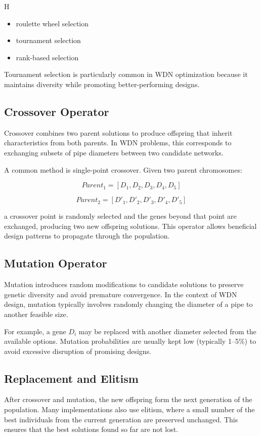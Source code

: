 H\documentclass[12pt, a4paper]{article}
\begin{document}
\begin{itemize}
\item roulette wheel selection
\item tournament selection
\item rank-based selection
\end{itemize}

Tournament selection is particularly common in WDN optimization because it maintains diversity while promoting better-performing designs.

\subsection*{Crossover Operator}

Crossover combines two parent solutions to produce offspring that inherit characteristics from both parents. In WDN problems, this corresponds to exchanging subsets of pipe diameters between two candidate networks.

A common method is single-point crossover. Given two parent chromosomes:

\[
Parent_1 = [D_1, D_2, D_3, D_4, D_5]
\]

\[
Parent_2 = [D'_1, D'_2, D'_3, D'_4, D'_5]
\]

a crossover point is randomly selected and the genes beyond that point are exchanged, producing two new offspring solutions. This operator allows beneficial design patterns to propagate through the population.

\subsection*{Mutation Operator}

Mutation introduces random modifications to candidate solutions to preserve genetic diversity and avoid premature convergence. In the context of WDN design, mutation typically involves randomly changing the diameter of a pipe to another feasible size.

For example, a gene $D_i$ may be replaced with another diameter selected from the available options. Mutation probabilities are usually kept low (typically 1--5\%) to avoid excessive disruption of promising designs.

\subsection*{Replacement and Elitism}

After crossover and mutation, the new offspring form the next generation of the population. Many implementations also use elitism, where a small number of the best individuals from the current generation are preserved unchanged. This ensures that the best solutions found so far are not lost.
\end{document}
